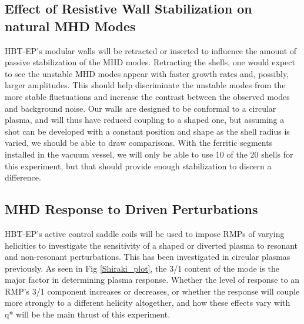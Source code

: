 \documentclass[aps,prl,twocolumn,superscriptaddress,groupedaddress]{revtex4}  %
\begin{document}
	\subsection{Effect of Resistive Wall Stabilization on natural MHD Modes}	 
HBT-EP's modular walls will be retracted or inserted to influence the amount of passive stabilization of the MHD modes.  Retracting the shells, one would expect to see the unstable MHD modes appear with faster growth rates and, possibly, larger amplitudes\cite{Shiraki}.  This should help discriminate the unstable modes from the more stable fluctuations and increase the contrast between the observed modes and background noise.  Our walls are designed to be conformal to a circular plasma, and will thus have reduced coupling to a shaped one, but assuming a shot can be developed with a constant position and shape as the shell radius is varied, we should be able to draw comparisons.  With the ferritic segments installed in the vacuum vessel, we will only be able to use 10 of the 20 shells for this experiment, but that should provide enough stabilization to discern a difference.\par
	\subsection{MHD Response to Driven Perturbations}
HBT-EP's active control saddle coils will be used to impose RMPs of varying helicities to investigate the sensitivity of a shaped or diverted plasma to resonant and non-resonant perturbations.  This has been investigated in circular plasmas previously\cite{Shiraki}.  As seen in Fig \ref{Shiraki_plot}, the 3/1 content of the mode is the major factor in determining plasma response.  Whether the level of response to an RMP's 3/1 component increases or decreases, or whether the response will couple more strongly to a different helicity altogether, and how these effects vary with q* will be the main thrust of this experiment.\par
	
\end{document}
